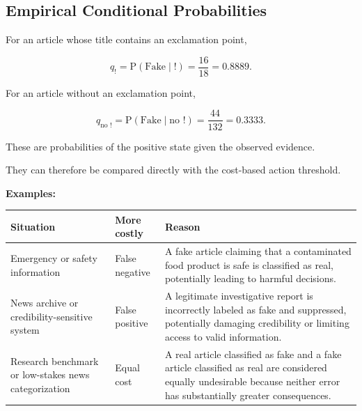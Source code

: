 \documentclass[11pt]{article}
\newcommand{\Prob}{\mathrm{P}}
\begin{document}
\subsection{Empirical Conditional Probabilities}

For an article whose title contains an exclamation point,

\[
q_{!}
=
\Prob(\text{Fake}\mid !)
=
\frac{16}{18}
=
0.8889.
\]

For an article without an exclamation point,

\[
q_{\text{no }!}
=
\Prob(\text{Fake}\mid\text{no }!)
=
\frac{44}{132}
=
0.3333.
\]

These are probabilities of the positive state given the observed evidence.

They can therefore be compared directly with the cost-based action threshold.

\textbf{Examples:}

\begin{table}[ht]
\begin{tabularx}{\textwidth}{
    @{}
    >{\raggedright\arraybackslash}p{}
    >{\raggedright\arraybackslash}p{}
    >{\raggedright\arraybackslash}X
    @{}
}
\hline
\textbf{Situation} & \textbf{More costly} & \textbf{Reason} \\
\hline

Emergency or safety information
& False negative
& A fake article claiming that a contaminated food product is safe is classified as real, potentially leading to harmful decisions. \\

News archive or credibility-sensitive system
& False positive
& A legitimate investigative report is incorrectly labeled as fake and suppressed, potentially damaging credibility or limiting access to valid information. \\

Research benchmark or low-stakes news categorization
& Equal cost
& A real article classified as fake and a fake article classified as real are considered equally undesirable because neither error has substantially greater consequences. \\

\hline
\end{tabularx}

\label{tab:fake_news_costs}
\end{table}
\end{document}
